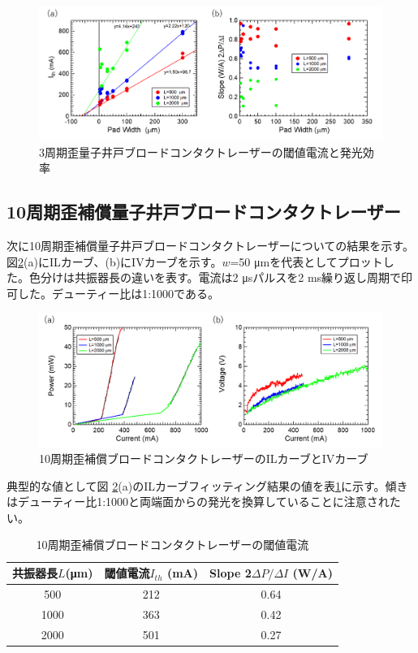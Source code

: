 \begin{figure}[h]
	\centering
	\includegraphics[width=15cm]{figure/fig_3_1_3QW_broadcontact_Ith.png}
		\caption{3周期歪量子井戸ブロードコンタクトレーザーの閾値電流と発光効率}
		\label{fig:fig_3_1_3QW_broadcontact_Ith}
\end{figure}
\clearpage
\subsection{10周期歪補償量子井戸ブロードコンタクトレーザー}%
次に10周期歪補償量子井戸ブロードコンタクトレーザーについての結果を示す。図\ref{fig:fig_3_1_10QW_broadcontact_IL}(a)にILカーブ、(b)にIVカーブを示す。$w$=50 \si{\micro\metre}を代表としてプロットした。色分けは共振器長の違いを表す。電流は2 \si{\micro s}パルスを2 ms繰り返し周期で印可した。デューティー比は1:1000である。
\begin{figure}[h]
	\centering
	\includegraphics[width=15cm]{figure/fig_3_1_10QW_broadcontact_IL.png}
		\caption{10周期歪補償ブロードコンタクトレーザーのILカーブとIVカーブ}
		\label{fig:fig_3_1_10QW_broadcontact_IL}
\end{figure}

典型的な値として図
\ref{fig:fig_3_1_10QW_broadcontact_IL}(a)のILカーブフィッティング結果の値を表\ref{table:table_3_1_10QW_broadcontact}に示す。傾きはデューティー比1:1000と両端面からの発光を換算していることに注意されたい。
\begin{table}[h]
  \caption{10周期歪補償ブロードコンタクトレーザーの閾値電流}
  \label{table:table_3_1_10QW_broadcontact}
  \centering
  \begin{tabular}{ccc}
    \hline
    共振器長$L$(\si{\micro\metre})  & 閾値電流$I_{th}$ (mA)  & Slope 2$\Delta P/\Delta I$ (W/A) \\
    \hline \hline
     500& 212&  0.64  \\
    1000& 363& 0.42\\
    2000& 501&0.27\\
       \hline
  \end{tabular}
\end{table}

